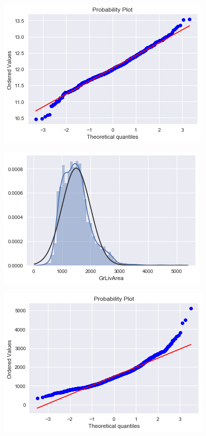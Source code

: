 \documentclass{article}
\begin{document}
			\begin{figure}[H]
				\centering
				\includegraphics[scale=0.8]{../img/saleprice_norm_after_2}
				\caption{}
			\end{figure}
			
			\begin{figure}[H]
				\centering
				\includegraphics[scale=0.8]{../img/grlivearea_norm_1}
				\caption{}
			\end{figure}
			
			\begin{figure}[H]
				\centering
				\includegraphics[scale=0.8]{../img/grlivearea_norm_2}
				\caption{}
			\end{figure}
			
\end{document}
